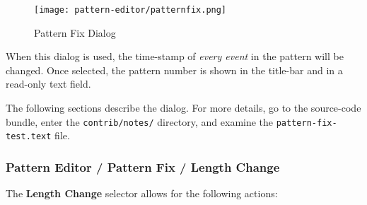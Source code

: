 \begin{figure}[H]
   \centering 
   \texttt{[image: pattern-editor/patternfix.png]}
   \caption{Pattern Fix Dialog}
   \label{fig:pattern_editor_pattern_fix}
\end{figure}

   When this dialog is used, the time-stamp of \textsl{every event} in the
   pattern will be changed.
   Once selected, the pattern number is shown in the title-bar and in a
   read-only text field.

   The following sections describe the dialog.
   For more details, go to the source-code bundle, enter the
   \texttt{contrib/notes/} directory, and
   examine the \texttt{pattern-fix-test.text} file.

\subsubsection{Pattern Editor / Pattern Fix / Length Change}
\label{subsubsection:patterns_fix_length_change}

   The \textbf{Length Change} selector allows for the following actions:

